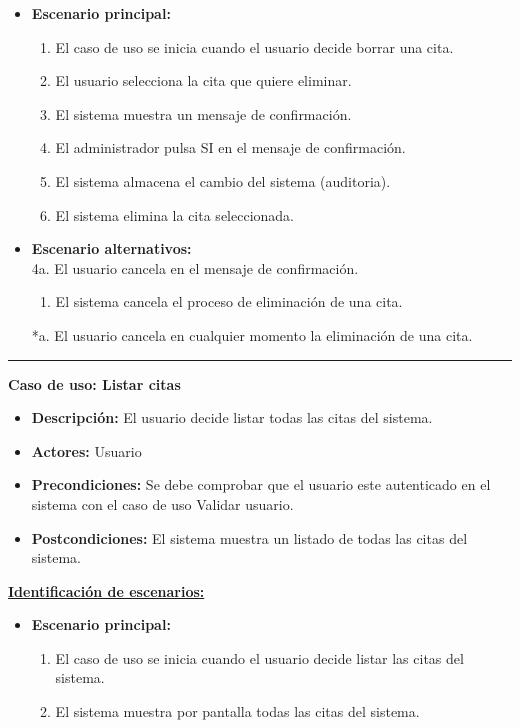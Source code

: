 \begin{itemize}\renewcommand{\labelitemi}{$\circ$}
 \item \textbf{Escenario principal:}
         \begin{enumerate}
          \item El caso de uso se inicia cuando el usuario decide borrar una cita.
          \item El usuario selecciona la cita que quiere eliminar.
          \item El sistema muestra un mensaje de confirmación.
          \item El administrador pulsa SI en el mensaje de confirmación.
 	  \item El sistema almacena el cambio del sistema (auditoria).
          \item El sistema elimina la cita seleccionada.
         \end{enumerate}
  \item \textbf{Escenario alternativos:}\\
  			4a. El usuario cancela en el mensaje de confirmación.
  			\begin{enumerate}
  			\item El sistema cancela el proceso de eliminación de una cita.
  			\end{enumerate}
          *a. El usuario cancela en cualquier momento la eliminación de una cita.
\end{itemize}
\smallskip
\hrule height 1pt
\smallskip

\textbf{Caso de uso: Listar citas}
\begin{itemize}\renewcommand{\labelitemi}{$\cdot$}
 \item \textbf{Descripción:} El usuario decide listar todas las citas del sistema.
  \item \textbf{Actores:} Usuario
  \item \textbf{Precondiciones:} Se debe comprobar que el usuario este autenticado en el sistema con el caso de uso Validar usuario.
  \item \textbf{Postcondiciones:} El sistema muestra un listado de todas las citas del sistema.
\end{itemize}
\underline{\textbf{Identificación de escenarios:}}
\begin{itemize}\renewcommand{\labelitemi}{$\circ$}
 \item \textbf{Escenario principal:}
         \begin{enumerate}
          \item El caso de uso se inicia cuando el usuario decide listar las citas del sistema.
	  \item El sistema muestra por pantalla todas las citas del sistema.
         \end{enumerate}
\end{itemize}

